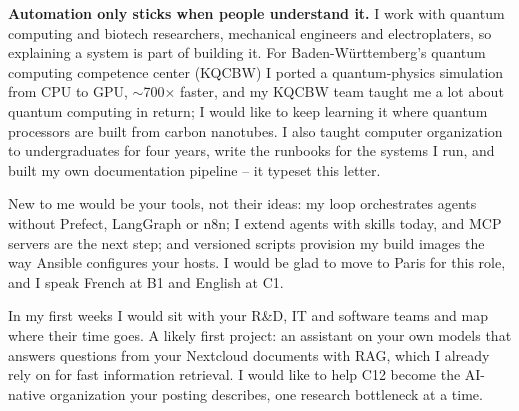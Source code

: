 {	\textbf{Automation only sticks when people understand it.} I work with quantum computing and biotech researchers, mechanical engineers and electroplaters, so explaining a system is part of building it. For Baden-W\"urttemberg's quantum computing competence center (KQCBW) I ported a quantum-physics simulation from CPU to GPU, $\sim$700$\times$ faster, and my KQCBW team taught me a lot about quantum computing in return; I would like to keep learning it where quantum processors are built from carbon nanotubes. I also taught computer organization to undergraduates for four years, write the runbooks for the systems I run, and built my own documentation pipeline -- it typeset this letter.

	New to me would be your tools, not their ideas: my loop orchestrates agents without Prefect, LangGraph or n8n; I extend agents with skills today, and MCP servers are the next step; and versioned scripts provision my build images the way Ansible configures your hosts. I would be glad to move to Paris for this role, and I speak French at B1 and English at C1.

	In my first weeks I would sit with your R\&D, IT and software teams and map where their time goes. A likely first project: an assistant on your own models that answers questions from your Nextcloud documents with RAG, which I already rely on for fast information retrieval. I would like to help C12 become the AI-native organization your posting describes, one research bottleneck at a time.

}
